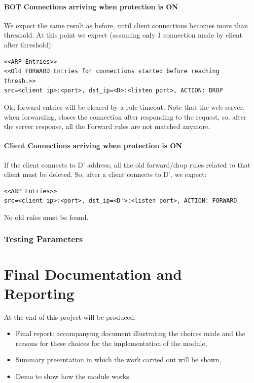 \paragraph{BOT Connections arriving when protection is ON}
We expect the same result as before, until client connections becomes more than threshold. At this point we expect (assuming only 1 connection made by client after threshold):
\begin{lstlisting}
<<ARP Entries>>
<<Old FORWARD Entries for connections started before reaching thresh.>>
src=<client ip>:<port>, dst_ip=<D>:<listen port>, ACTION: DROP
\end{lstlisting}
Old forward entries will be cleared by a rule timeout. Note that the web server, when forwarding, closes the connection after responding to the request, so, after the server response, all the Forward rules are not matched anymore.

\paragraph{Client Connections arriving when protection is ON}
If the client connects to D' address, all the old forward/drop rules related to that client must be deleted. So, after a client connects to D', we expect:
\begin{lstlisting}
<<ARP Entries>>
src=<client ip>:<port>, dst_ip=<D'>:<listen port>, ACTION: FORWARD
\end{lstlisting}
No old rules must be found.
\subsubsection{Testing Parameters}

\section{Final Documentation and Reporting}
At the end of this project will be produced:
\begin{itemize}
	\item Final report: accompanying document illustrating the choices made and the reasons for these choices for the implementation of the module,
	\item Summary presentation in which the work carried out will be shown,
	\item Demo to show how the module works.
\end{itemize}
